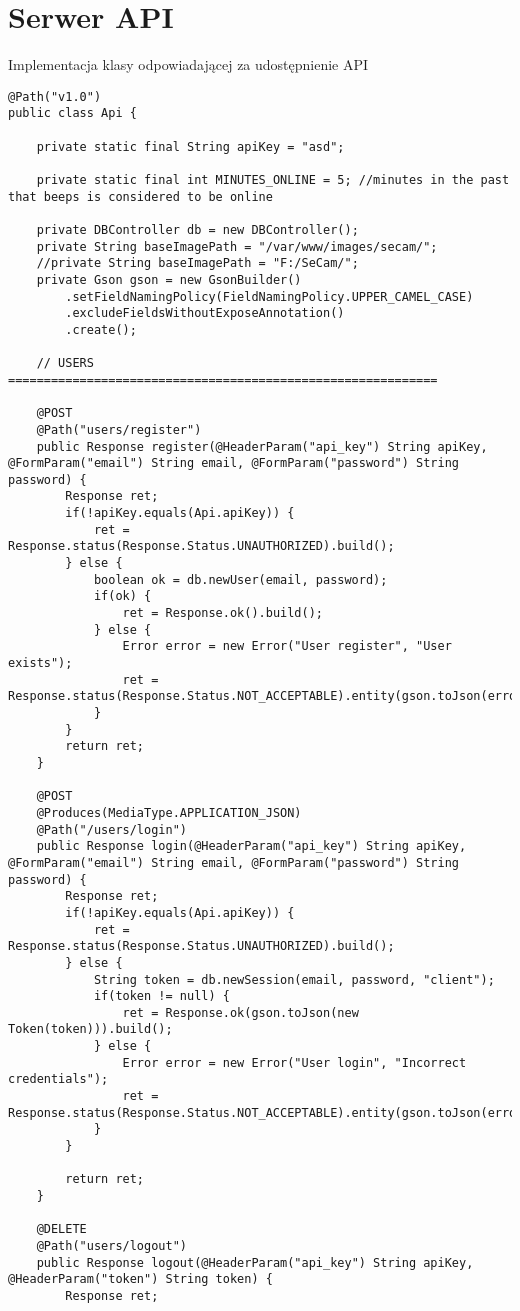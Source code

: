 \section{Serwer API}
\label{sec:serwerApi}

Implementacja klasy odpowiadającej za udostępnienie API

\begin{lstlisting}
@Path("v1.0")
public class Api {
	
	private static final String apiKey = "asd";
	
	private static final int MINUTES_ONLINE = 5; //minutes in the past that beeps is considered to be online
	
	private DBController db = new DBController();
	private String baseImagePath = "/var/www/images/secam/";
	//private String baseImagePath = "F:/SeCam/";
	private Gson gson = new GsonBuilder()
		.setFieldNamingPolicy(FieldNamingPolicy.UPPER_CAMEL_CASE)
		.excludeFieldsWithoutExposeAnnotation()
		.create();
	
	// USERS ============================================================
	
	@POST
	@Path("users/register")
	public Response register(@HeaderParam("api_key") String apiKey, @FormParam("email") String email, @FormParam("password") String password) {
		Response ret;
		if(!apiKey.equals(Api.apiKey)) {
			ret = Response.status(Response.Status.UNAUTHORIZED).build();
		} else {
			boolean ok = db.newUser(email, password);
			if(ok) {
				ret = Response.ok().build();
			} else {
				Error error = new Error("User register", "User exists");
				ret = Response.status(Response.Status.NOT_ACCEPTABLE).entity(gson.toJson(error)).build();
			}
		}
		return ret;
	}
	
	@POST
	@Produces(MediaType.APPLICATION_JSON)
	@Path("/users/login")
	public Response login(@HeaderParam("api_key") String apiKey, @FormParam("email") String email, @FormParam("password") String password) {
		Response ret;
		if(!apiKey.equals(Api.apiKey)) {
			ret = Response.status(Response.Status.UNAUTHORIZED).build();
		} else {
			String token = db.newSession(email, password, "client");
			if(token != null) {
				ret = Response.ok(gson.toJson(new Token(token))).build();
			} else {
				Error error = new Error("User login", "Incorrect credentials");
				ret = Response.status(Response.Status.NOT_ACCEPTABLE).entity(gson.toJson(error)).build();
			}
		}
		
		return ret;
	}
	
	@DELETE
	@Path("users/logout")
	public Response logout(@HeaderParam("api_key") String apiKey, @HeaderParam("token") String token) {
		Response ret;
		

\end{lstlisting}
